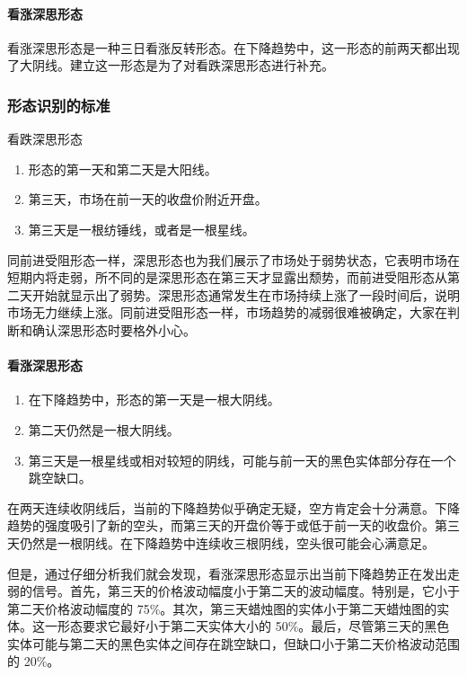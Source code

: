 \paragraph{看涨深思形态} 看涨深思形态是一种三日看涨反转形态。在下降趋势中，这一形态的前两天都出现了大阴线。建立这一形态是为了对看跌深思形态进行补充。


\subsubsection*{形态识别的标准}
看跌深思形态
\begin{enumerate}
    \item 形态的第一天和第二天是大阳线。
    \item 第三天，市场在前一天的收盘价附近开盘。
    \item 第三天是一根纺锤线，或者是一根星线。
\end{enumerate}

同前进受阻形态一样，深思形态也为我们展示了市场处于弱势状态，它表明市场在短期内将走弱，所不同的是深思形态在第三天才显露出颓势，而前进受阻形态从第二天开始就显示出了弱势。深思形态通常发生在市场持续上涨了一段时间后，说明市场无力继续上涨。同前进受阻形态一样，市场趋势的减弱很难被确定，大家在判断和确认深思形态时要格外小心。

\paragraph{看涨深思形态}
\begin{enumerate}
    \item 在下降趋势中，形态的第一天是一根大阴线。
    \item 第二天仍然是一根大阴线。
    \item 第三天是一根星线或相对较短的阴线，可能与前一天的黑色实体部分存在一个跳空缺口。
\end{enumerate}

在两天连续收阴线后，当前的下降趋势似乎确定无疑，空方肯定会十分满意。下降趋势的强度吸引了新的空头，而第三天的开盘价等于或低于前一天的收盘价。第三天仍然是一根阴线。在下降趋势中连续收三根阴线，空头很可能会心满意足。

但是，通过仔细分析我们就会发现，看涨深思形态显示出当前下降趋势正在发出走弱的信号。首先，第三天的价格波动幅度小于第二天的波动幅度。特别是，它小于第二天价格波动幅度的 75\%。其次，第三天蜡烛图的实体小于第二天蜡烛图的实体。这一形态要求它最好小于第二天实体大小的 50\%。最后，尽管第三天的黑色实体可能与第二天的黑色实体之间存在跳空缺口，但缺口小于第二天价格波动范围的 20\%。
